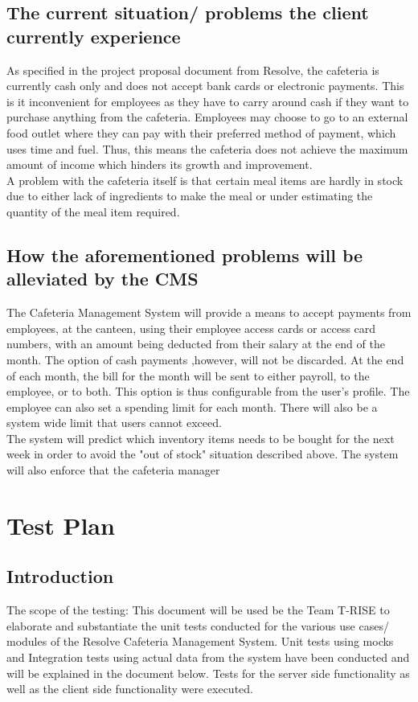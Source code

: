 \documentclass[a4paper,12pt]{report}
\begin{document}
\subsection{The current situation/ problems the client currently experience}
As specified in the project proposal document from Resolve, the cafeteria is currently cash only and does not accept bank cards or electronic payments. This is it inconvenient for employees as they have to carry around cash if they want to purchase anything from the cafeteria. Employees may choose to go to an external food outlet where they can pay with their preferred method of payment, which uses time and fuel. Thus, this means the cafeteria does not achieve the maximum amount of income which hinders its growth and improvement.\\ A problem with the cafeteria itself is that certain meal items are hardly in stock due to either lack of ingredients to make the meal or under estimating the quantity of the meal item required.

\subsection{How the aforementioned problems will be alleviated by the CMS}
The Cafeteria Management System will provide a means to accept payments from employees, at the canteen, using their employee access cards or access card numbers, with an amount being deducted from their salary at the end of the month.  The option of cash payments ,however, will not be discarded. At the end of each month, the bill for the month will be sent to either payroll, to the employee, or to both. This option is thus configurable from the user's profile. The employee can also set a spending limit for each month. There will also be a system wide limit that users cannot exceed.
\\
The system will predict which inventory items needs to be bought for the next week in order to avoid the "out of stock" situation described above. The system will also enforce that the cafeteria manager 
\\
\section{Test Plan}

\subsection{Introduction}
The scope of the testing: This document will be used be the Team T-RISE to elaborate and substantiate the unit tests conducted for the various use cases/ modules of the Resolve Cafeteria Management System. Unit tests using mocks and Integration tests using actual data from the system have been conducted and will be explained in the document below. Tests for the server side functionality as well as the client side functionality were executed.
\end{document}
